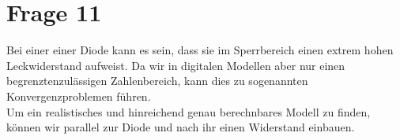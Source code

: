 \documentclass[a4paper]{scrartcl}
\begin{document}
\section*{Frage 11}
Bei einer einer Diode kann es sein, dass sie im Sperrbereich einen extrem hohen Leckwiderstand aufweist. Da wir in digitalen Modellen aber nur einen begrenztenzulässigen Zahlenbereich, kann dies zu sogenannten Konvergenzproblemen führen.\\
Um ein realistisches und hinreichend genau berechnbares Modell zu finden, können wir parallel zur Diode und nach ihr einen Widerstand einbauen.
\end{document}
